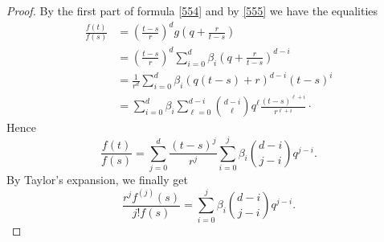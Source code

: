 \documentclass[10pt]{article}
\theoremstyle{definition}
\numberwithin{equation}{section}
\begin{document}
\begin{proof} By the first part of formula \eqref{554} and by \eqref{555}
we have the equalities 
\[
\begin{aligned}
\frac {f(t)}{f(s)}&=\left(\frac{t-s} r\right)^d g\left(q+\frac r {t-s}\right)
\\
&=
\left(\frac{t-s} r\right)^d 
\sum_{i=0}^d \beta_i \left(q+\frac r {t-s}\right)^{d-i}
\\
&=\frac 1 {r^d}
\sum_{i=0}^d \beta_i(q(t-s)+r)^{d-i}(t-s)^i
\\
&= 
\sum_{i=0}^d \beta_i
\sum_{\ell=0}^{d-i} \binom{d-i}{\ell} q^\ell \frac{(t-s)^{\ell+i}}{r^{\ell+i}}\cdotp
\end{aligned}
\]
Hence
\begin{equation}\label{equation:f(t)/f(s)}
\frac {f(t)}{f(s)}=\sum_{j=0}^d \frac{(t-s)^j}{r^j}\sum_{i=0}^j \beta_i\binom{d-i}{j-i} 
 q^{j-i}.
\end{equation}
By Taylor's expansion, we finally get 
\[
\frac{r^jf^{(j)}(s)}{j!f(s)}=\sum_{i=0}^j \beta_i\binom{d-i}{j-i} 
q^{j-i}.
\]
\end{proof}
\end{document}
